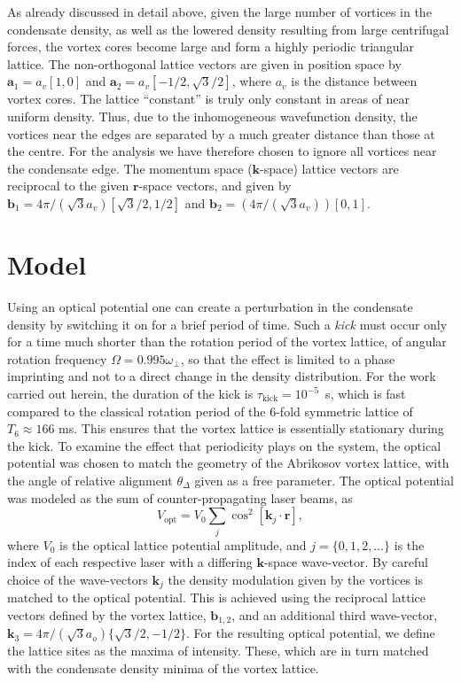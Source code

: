 As already discussed in detail above, given the large number of vortices in the condensate density, as well as the lowered density resulting from large centrifugal forces, the vortex cores become large and form a highly periodic triangular lattice. The non-orthogonal lattice vectors are given in position space by $\mathbf{a}_1 = a_v[1,0]$ and $\mathbf{a}_2 = a_v[-1/2, \sqrt{3}/2]$, where $a_v$ is the distance between vortex cores. The lattice ``constant'' is truly only constant in areas of near uniform density. Thus, due to the inhomogeneous wavefunction density, the vortices near the edges are separated by a much greater distance than those at the centre. For the analysis we have therefore chosen to ignore all vortices near the condensate edge. The momentum space ($\mathbf{k}$-space) lattice vectors are reciprocal to the given $\mathbf{r}$-space vectors, and given by $\mathbf{b}_1 = 4\pi/(\sqrt{3}a_v)[\sqrt{3}/2,1/2]$ and $\mathbf{b}_2 = (4\pi/(\sqrt{3}a_v))[0,1]$.

\section{Model}

Using an optical potential one can create a perturbation in the condensate density by switching it on for a brief period of time. Such a {\it kick} must occur only for a time much shorter than the rotation period of the vortex lattice, of angular rotation frequency $\Omega = 0.995\omega_\perp$, so that the effect is limited to a phase imprinting and not to a direct change in the density distribution. For the work carried out herein, the duration of the kick is $\tau_{\text{kick}}=10^{-5}$~s, which is fast compared to the classical rotation period of the 6-fold symmetric lattice of $T_{6} \approx 166 $ ms. This ensures that the vortex lattice is essentially stationary during the kick. To examine the effect that periodicity plays on the system, the optical potential was chosen to match the geometry of the Abrikosov vortex lattice, with the angle of relative alignment $\theta_\Delta$ given as a free parameter. The optical potential was modeled as the sum of counter-propagating laser beams, as
\begin{equation}
    V_{\text{opt}} = V_0\displaystyle\sum_{j}\cos^2 \left[ \textbf{k}_{j}\cdot\textbf{r} \right],
\end{equation}
where $V_0$ is the optical lattice potential amplitude, and $j=\lbrace 0,1,2,\ldots \rbrace$ is the index of each respective laser with a differing $\mathbf{k}$-space wave-vector. By careful choice of the wave-vectors $\textbf{k}_{j}$ the density modulation given by the vortices is matched to the optical potential. This is achieved using the reciprocal lattice vectors defined by the vortex lattice, $\mathbf{b}_{1,2}$, and an additional third wave-vector, $\mathbf{k}_3 = 4\pi/(\sqrt{3}a_o)\{\sqrt{3}/2,-1/2\}$. For the resulting optical potential, we define the lattice sites as the maxima of intensity. These, which are in turn matched with the condensate density minima of the vortex lattice.


